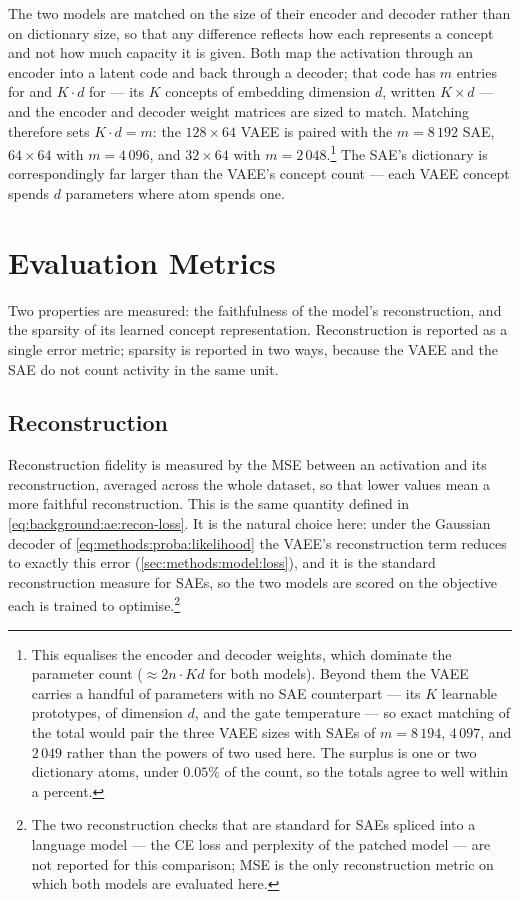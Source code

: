 The two models are matched on the size of their encoder and decoder rather than
on dictionary size, so that any difference reflects how each represents a
concept and not how much capacity it is given. Both map the activation through
an encoder into a latent code and back through a decoder; that code has $m$
entries for  and $K \cdot d$ for  --- its $K$ concepts of
embedding dimension $d$, written $K \times d$ --- and the encoder and decoder
weight matrices are sized to match. Matching therefore sets $K \cdot d = m$: the
$128 \times 64$ \ac{VAEE} is paired with the $m = 8\,192$ \ac{SAE}, $64
\times 64$ with $m = 4\,096$, and $32 \times 64$ with $m =
2\,048$.\footnote{This equalises the encoder and decoder weights, which dominate
    the parameter count ($\approx 2 n \cdot K d$ for both models). Beyond them
    the \ac{VAEE} carries a handful of parameters with no \ac{SAE} counterpart
    --- its $K$ learnable prototypes, of dimension $d$, and the gate temperature
    --- so exact matching of the total would pair the three \ac{VAEE} sizes with
    \acp{SAE} of $m = 8\,194$, $4\,097$, and $2\,049$ rather than the powers of
    two used here. The surplus is one or two dictionary atoms, under $0.05\%$ of
the count, so the totals agree to well within a percent.} The \ac{SAE}'s
dictionary is correspondingly far larger than the \ac{VAEE}'s concept count ---
each \ac{VAEE} concept spends $d$ parameters where  atom spends one.

\section{Evaluation Metrics} \label{sec:exp:metrics}

Two properties are measured: the faithfulness of the model's reconstruction, and
the sparsity of its learned concept representation. Reconstruction is reported
as a single error metric; sparsity is reported in two ways, because the
\ac{VAEE} and the \ac{SAE} do not count activity in the same unit.

\subsection{Reconstruction} Reconstruction fidelity is measured by the \ac{MSE}
between an activation and its reconstruction, averaged across the whole dataset,
so that lower values mean a more faithful reconstruction.
This is the same quantity defined in
\cref{eq:background:ae:recon-loss}. It is the natural choice
here: under the Gaussian decoder of \cref{eq:methods:proba:likelihood}
the \ac{VAEE}'s reconstruction term reduces to exactly this
error (\cref{sec:methods:model:loss}),
and it is the standard reconstruction measure for \acp{SAE}, so the two models
are scored on the objective each is trained to optimise.\footnote{The two
reconstruction checks that are standard for \acp{SAE} spliced into a language
model --- the \ac{CE} loss and perplexity of the patched model --- are not
reported for this comparison; \ac{MSE} is the only reconstruction metric on
which both models are evaluated here.}

